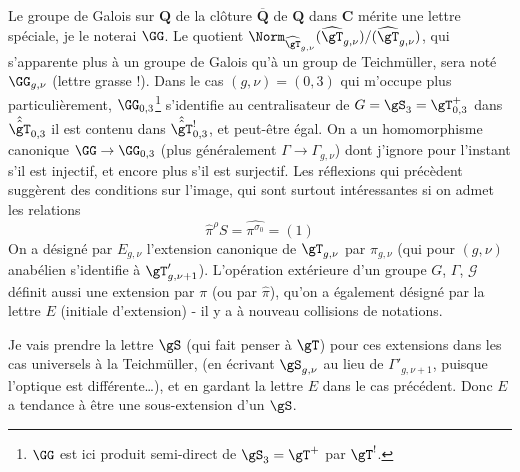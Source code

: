 Le groupe de Galois sur $\mathbf{Q}$ de la clôture $\overline{\mathbf{Q}}$ de $\mathbf{Q}$ dans $\mathbf{C}$ mérite une lettre spéciale, je le noterai $\GG$. Le quotient $\Norm_{\widehat{\gT}_{g, \nu}}(\widehat{\gT}_{g, \nu})/(\widehat{\gT}_{g, \nu})$, qui s'apparente plus à un groupe de Galois qu'à un group de Teichmüller, sera noté $\GG_{g, \nu}$ (lettre grasse !). Dans le cas $(g, \nu) = (0, 3)$ qui m'occupe plus particulièrement, $\GG_{0, 3}$\footnote{$\GG$ est ici produit semi-direct de $\gS_3 = \gT^+$ par $\gT^!$.} s'identifie au centralisateur de $G = \gS_3 = \gT^+_{0, 3}$ dans $\hat{\hat\gT}_{0, 3}$ il est contenu dans $\hat{\hat\gT}^!_{0, 3}$, et peut-être égal. On a un homomorphisme canonique $\GG \to \GG_{0, 3}$ (plus généralement $\Gamma \to \Gamma_{g, \nu}$) dont j'ignore pour l'instant s'il est injectif, et encore plus s'il est surjectif. Les réflexions qui précèdent suggèrent des conditions sur l'image, qui sont surtout intéressantes si on admet les relations
$$
\widehat{\pi}^\rho S = \widehat{\pi^{\sigma_0}} = (1)
$$
On a désigné par $E_{g, \nu}$ l'extension canonique de $\gT_{g, \nu}$ par $\pi_{g, \nu}$ (qui pour $(g, \nu)$ anabélien s'identifie à $\gT'_{g, \nu + 1}$). L'opération extérieure d'un groupe $G$, $\Gamma$, $\mathcal{G}$ définit aussi une extension par $\pi$ (ou par $\widehat{\pi}$), qu'on a également désigné par la lettre $E$ (initiale d'extension) - il y a à nouveau collisions de notations.

Je vais prendre la lettre $\gS$ (qui fait penser à $\gT$) pour ces extensions dans les cas universels à la Teichmüller, (en écrivant $\gS_{g, \nu}$ au lieu de $\Gamma'_{g, \nu+1}$, puisque l'optique est différente\dots), et en gardant la lettre $E$ dans le cas précédent. Donc $E$ a tendance à être une sous-extension d'un $\gS$.

